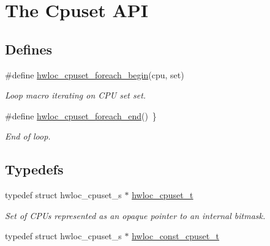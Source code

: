 \hypertarget{group__hwlocality__cpuset}{
\section{The Cpuset API}
\label{group__hwlocality__cpuset}
}
\subsection*{Defines}
\begin{DoxyCompactItemize}
\item 
\#define \hyperlink{group__hwlocality__cpuset_ga8f896ce703ad1740fdf9ce8ac6361359}{hwloc\_\-cpuset\_\-foreach\_\-begin}(cpu, set)
\begin{DoxyCompactList}\small\item\em Loop macro iterating on CPU set {\ttfamily set}. \item\end{DoxyCompactList}\item 
\#define \hyperlink{group__hwlocality__cpuset_gae2974be78a7d7cddbd38cb23fcc6240a}{hwloc\_\-cpuset\_\-foreach\_\-end}()~\}
\begin{DoxyCompactList}\small\item\em End of loop. \item\end{DoxyCompactList}\end{DoxyCompactItemize}
\subsection*{Typedefs}
\begin{DoxyCompactItemize}
\item 
typedef struct hwloc\_\-cpuset\_\-s $\ast$ \hyperlink{group__hwlocality__cpuset_ga7366332f7090f5b54d4b25a0c2c4b411}{hwloc\_\-cpuset\_\-t}
\begin{DoxyCompactList}\small\item\em Set of CPUs represented as an opaque pointer to an internal bitmask. \item\end{DoxyCompactList}\item 
typedef struct hwloc\_\-cpuset\_\-s $\ast$ \hyperlink{group__hwlocality__cpuset_gad2f7833583d020af31e01554251dbe11}{hwloc\_\-const\_\-cpuset\_\-t}
\end{DoxyCompactItemize}
